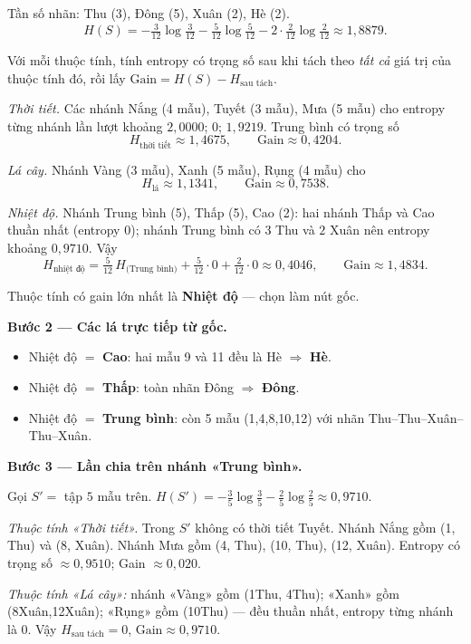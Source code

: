 Tần số nhãn: Thu (3), Đông (5), Xuân (2), Hè (2).
\[
H(S)= -\tfrac{3}{12}\log\tfrac{3}{12}-\tfrac{5}{12}\log\tfrac{5}{12}
      -2\cdot\tfrac{2}{12}\log\tfrac{2}{12}
      \approx 1{,}8879.
\]

Với mỗi thuộc tính, tính entropy có trọng số sau khi tách theo \emph{tất cả} giá trị của thuộc tính đó, rồi lấy \(\text{Gain}=H(S)-H_{\text{sau tách}}\).

\emph{Thời tiết.} Các nhánh Nắng (4 mẫu), Tuyết (3 mẫu), Mưa (5 mẫu) cho entropy từng nhánh lần lượt khoảng \(2{,}0000\); \(0\); \(1{,}9219\). Trung bình có trọng số
\[
H_{\text{thời tiết}}\approx 1{,}4675,\qquad \text{Gain}\approx 0{,}4204.
\]

\emph{Lá cây.} Nhánh Vàng (3 mẫu), Xanh (5 mẫu), Rụng (4 mẫu) cho
\[
H_{\text{lá}}\approx 1{,}1341,\qquad \text{Gain}\approx 0{,}7538.
\]

\emph{Nhiệt độ.} Nhánh Trung bình (5), Thấp (5), Cao (2): hai nhánh Thấp và Cao thuần nhất (entropy \(0\)); nhánh Trung bình có \(3\) Thu và \(2\) Xuân nên entropy khoảng \(0{,}9710\). Vậy
\[
H_{\text{nhiệt độ}}
=\tfrac{5}{12}\,H_{\text{(Trung bình)}}+\tfrac{5}{12}\cdot 0+\tfrac{2}{12}\cdot 0
\approx 0{,}4046,\qquad \text{Gain}\approx 1{,}4834.
\]

Thuộc tính có gain lớn nhất là \textbf{Nhiệt độ} --- chọn làm nút gốc.

\textbf{Bước 2 --- Các lá trực tiếp từ gốc.}
\begin{itemize}\setlength\itemsep{0pt}
  \item Nhiệt độ \(=\) \textbf{Cao}: hai mẫu 9 và 11 đều là Hè \(\Rightarrow\) \textbf{Hè}.
  \item Nhiệt độ \(=\) \textbf{Thấp}: toàn nhãn Đông \(\Rightarrow\) \textbf{Đông}.
  \item Nhiệt độ \(=\) \textbf{Trung bình}: còn 5 mẫu (1,4,8,10,12) với nhãn Thu--Thu--Xuân--Thu--Xuân.
\end{itemize}

\textbf{Bước 3 --- Lần chia trên nhánh «Trung bình».}

Gọi \(S'=\) tập \(5\) mẫu trên. \(H(S')=-\tfrac{3}{5}\log\tfrac{3}{5}-\tfrac{2}{5}\log\tfrac{2}{5}\approx 0{,}9710\).

\emph{Thuộc tính «Thời tiết».} Trong \(S'\) không có thời tiết Tuyết. Nhánh Nắng gồm (1, Thu) và (8, Xuân). Nhánh Mưa gồm (4, Thu), (10, Thu), (12, Xuân). Entropy có trọng số \(\approx 0{,}9510\); Gain \(\approx 0{,}020\).

\emph{Thuộc tính «Lá cây»:} nhánh «Vàng» gồm (1Thu, 4Thu); «Xanh» gồm (8Xuân,12Xuân); «Rụng» gồm (10Thu) --- đều thuần nhất, entropy từng nhánh là \(0\). Vậy \(H_{\text{sau tách}}=0\), \(\text{Gain}\approx 0{,}9710\).

